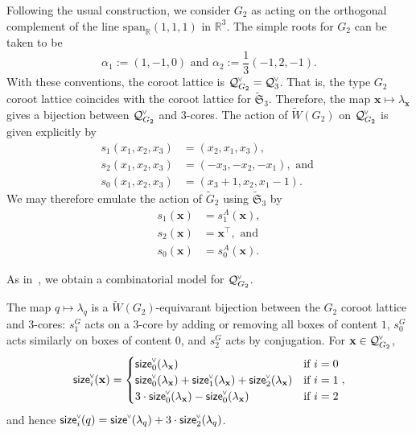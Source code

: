 \documentclass[ALCO,published]{cedram}
\newcommand{\chk}[1]{#1^{\normalfont\smash{\scalebox{.5}[.5]{\rotatebox{90}{\textbf{\textless}}}}}}
\newcommand{\wa}{\widetilde{W}}
\newcommand{\Q}{\mathcal{Q}}
\newcommand{\size}{{\sf size}}
\begin{document}
Following the usual construction, we consider $G_2$ as acting on the orthogonal complement of the line $\mathrm{span}_\mathbb{R}(1,1,1)$ in $\mathbb{R}^3$.  The simple roots for $G_2$ can be taken to be \[\alpha_1:=(1,-1,0) \text{ and } \alpha_2 := \textstyle\frac{1}{3}(-1,2,-1).\]  With these conventions, the coroot lattice is $\chk{\Q}_{G_2} = \chk{\Q}_3$. That is, the type $G_2$ coroot lattice coincides with the coroot lattice for $\widetilde{\mathfrak{S}}_{3}$. Therefore, the map $\mathbf{x}\mapsto\lambda_{\mathbf{x}}$ gives a bijection between $\chk{\Q}_{G_2}$ and $3$-cores.  The action of $\wa(G_2)$ on $\chk{\Q}_{G_2}$ is given explicitly by
\begin{align*}s_1(x_1,x_2,x_3) &= (x_2,x_1,x_3),\\
s_2(x_1,x_2,x_3) &= (-x_3,-x_2,-x_1), \text{ and }\\
s_0(x_1,x_2,x_3) &= (x_3+1,x_2,x_1-1).
\end{align*}
We may therefore emulate the action of $\widetilde{G}_2$ using $\widetilde{\mathfrak{S}}_{3}$ by
\begin{align*}
s_1(\mathbf{x}) &= s_1^A(\mathbf{x}),\\
s_2(\mathbf{x}) &= \mathbf{x}^\intercal, \text{ and}\\
s_0(\mathbf{x}) &= s_0^A(\mathbf{x}).
\end{align*}


As in~\cite{cotton2021core}, we obtain a combinatorial model for $\chk{\Q}_{G_2}$.

\begin{theorem}
The map $q\mapsto \lambda_q$ is a $\wa(G_2)$-equivarant bijection between the $G_2$ coroot lattice and $3$-cores: $s_1^G$ acts on a 3-core by adding or removing all boxes of content $1$, $s_0^G$ acts similarly on boxes of content $0$, and $s_2^G$ acts by conjugation.  For $\mathbf{x} \in \chk{\Q}_{G_2}$,
\[ 
\chk{\size}_i(\mathbf{x}) = 
\begin{cases}
\chk{\size}_0(\lambda_{\mathbf{x}}) & \text{if } i=0 \\ 
\chk{\size}_0(\lambda_{\mathbf{x}}) + \chk{\size}_1(\lambda_{\mathbf{x}}) + \chk{\size}_2(\lambda_{\mathbf{x}}) & \text{if } i=1 \\ 3\cdot \chk{\size}_0(\lambda_{\mathbf{x}}) - \chk{\size}_0(\lambda_{\mathbf{x}}) & \text{if } i=2
\end{cases}
,
\]
and hence 
$\chk{\size}_i(q)=\chk{\size}(\lambda_q)+3\cdot\chk{\size}_2(\lambda_q)$.
\end{theorem}
\end{document}
